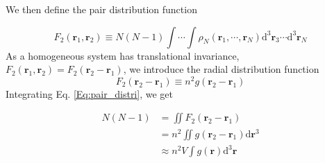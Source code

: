 \documentclass[letterpaper,12pt]{article}
\numberwithin{equation}{section}
\begin{document}
We then define the pair distribution function 

\begin{equation}
    \label{Eq:pair_distri}
    F_2(\boldsymbol{r}_1,\boldsymbol{r}_2)\equiv N(N-1)\int\cdots\int\rho_N(\boldsymbol{r}_1,\cdots,\boldsymbol{r}_N)\mathrm{d}^3\boldsymbol{r}_3\cdots\mathrm{d}^3\boldsymbol{r}_N
\end{equation}
As a homogeneous system has translational invariance, $F_2(\boldsymbol{r}_1,\boldsymbol{r}_2)=F_2(\boldsymbol{r}_2-\boldsymbol{r}_1)$, we introduce the radial distribution function 
\begin{equation}
    F_2(\boldsymbol{r}_2-\boldsymbol{r}_1)\equiv n^2g(\boldsymbol{r}_2-\boldsymbol{r}_1)
\end{equation}
Integrating Eq. \ref{Eq:pair_distri}, we get \cite{TSP}

\begin{equation}
    \begin{aligned}
        N(N-1)&=\iint{F_2(\boldsymbol{r}_2-\boldsymbol{r}_1)} \\
        &=n^2\iint{g(\boldsymbol{r}_2-\boldsymbol{r}_1)\mathrm{d}\boldsymbol{r}^3} \\
        &\approx n^2V\int{g(\boldsymbol{r})\mathrm{d}^3\boldsymbol{r}}
    \end{aligned}
\end{equation}
\end{document}
